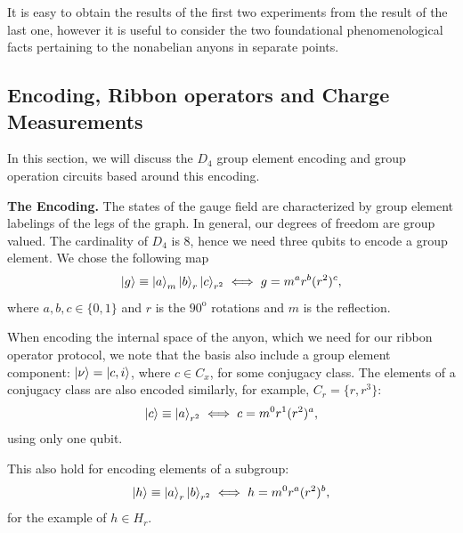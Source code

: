 \documentclass[two column]{article}
\newcommand{\caro}[1]{\textcolor{red}{[#1]}}
\begin{document}
It is easy to obtain the results of the first two experiments from the result of the last one, however it is useful to consider the two foundational phenomenological facts pertaining to the nonabelian anyons in separate points.

\subsection{Encoding, Ribbon operators and Charge Measurements}\label{subsec:enc}

In this section, we will discuss the $D_4$ group element encoding and group operation circuits based around this encoding.

\textbf{The Encoding.} The states of the gauge field are characterized by group element labelings of the legs of the graph.
In general, our degrees of freedom are group valued.
The cardinality of $D_4$ is 8, hence we need three qubits to encode a group element.
We chose the following map
\begin{equation}
    \ket{g} \equiv \ket{a}_m\ket{b}_r\ket{c}_{r^2} \iff g = m^a r^b (r^2)^c,
\end{equation}
where $a,b,c \in \{0,1\}$ and $r$ is the $90^{\text{o}}$ rotations and $m$ is the reflection.

When encoding the internal space of the anyon, which we need for our ribbon operator protocol, we note that the basis also include a group element component: $\ket{\nu} = \ket{c, i}$, where $c \in C_x$, for some conjugacy class.
The elements of a conjugacy class are also encoded similarly, for example, $C_r = \{r, r^3\}$:
\begin{equation}
    \ket{c} \equiv \ket{a}_{r^2} \iff c = m^0r^1(r^2)^a,
\end{equation}
using only one qubit.

This also hold for encoding elements of a subgroup:
\begin{equation}
    \ket{h} \equiv \ket{a}_r\ket{b}_{r^2} \iff h = m^0r^a(r^2)^b,
\end{equation}
for the example of $h \in H_r$.

\end{document}
